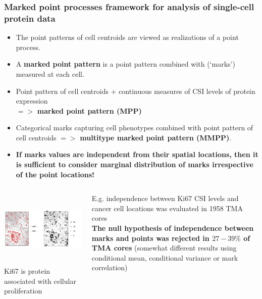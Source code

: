 \documentclass[t,8pt]{beamer}
\begin{document}
	\frame
	{\frametitle {Marked point processes framework for analysis of single-cell protein data}  
		\begin{itemize} 
		   \item The point patterns of cell centroids are viewed as realizations of a point process.
			\item A \textbf{marked point pattern} is a point pattern combined with (`marks') measured at each cell.	
			 \item Point pattern of cell centroids  + continuous measures of CSI levels of protein expression \\ $=>$ \textbf{marked point pattern (MPP)}		
			\item Categorical marks capturing cell phenotypes combined with point pattern of cell centroids $=>$  \textbf{multitype marked point pattern (MMPP)}.
               		\color{blue}
		  \item  \textbf{If marks values are independent from their spatial locations, then it is sufficient to consider marginal distribution of marks irrespective of the point locations!}
		\end{itemize} 
  \begin{columns}[T]
		      \begin{column}{0.6\textwidth}		      
			 \includegraphics[height=1.45in] {Figures/Ki67both.pdf}
			 Ki67 is protein associated with cellular proliferation
		      \end{column}
		\begin{column}{0.35\textwidth}
		 E.g. independence between Ki67 CSI levels and cancer cell locations was evaluated in 1958 TMA cores\\
		\color{red}
	  	 \textbf{The null hypothesis of independence between marks and points was rejected in $27-39\%$ of TMA cores}
		   \color{black}
		   (somewhat different results using conditional mean, conditional variance or mark correlation)	
		\end{column}		
	\end{columns}
	}
\end{document}
